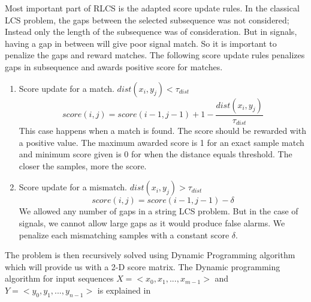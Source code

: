 \documentclass[MTech]{iitmdiss}
\begin{document}
Most important part of RLCS is the adapted score update rules. In the classical LCS problem, the gaps between the selected subsequence was not considered; Instead only the length of the subsequence was of consideration. But in signals, having a gap in between will give poor signal match. So it is important to penalize the gaps and reward matches.
The following score update rules penalizes gaps in subsequence and awards positive score for matches.
\begin{enumerate}
  \item Score update for a match. $dist(x_i, y_j) < \tau_{dist}$\\
  $$score(i, j) = score(i - 1, j - 1) + 1 - \frac{dist(x_i, y_j)}{\tau_{dist}}$$
  This case happens when a match is found. The score should be rewarded with a positive value.  The maximum awarded score is 1 for an exact sample match and minimum score given is 0 for when the distance equals threshold. The closer the samples, more the score.
  \item Score update for a mismatch. $dist(x_i, y_j) > \tau_{dist}$\\
  $$score(i, j) = score(i - 1, j - 1) - \delta$$
  We allowed any number of gaps in a string LCS problem. But in the case of signals, we cannot allow large gaps as it would produce false alarms. We penalize each mismatching samples with a constant score $\delta$.
\end{enumerate}
The problem is then recursively solved using  Dynamic Programming algorithm which will provide us with a 2-D score matrix. The Dynamic programming algorithm for input sequences $X = <x_0, x_1, ..., x_{m-1}>$ and $Y = <y_0, y_1, ..., y_{n-1}>$ is explained in 
\end{document}
